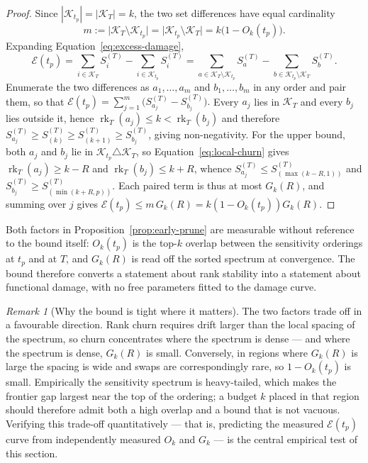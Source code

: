 \documentclass{article}
\theoremstyle{definition}
\theoremstyle{remark}
\newtheorem{remark}[theorem]{Remark}
\begin{document}
\begin{proof}
Since $|\mathcal K_{t_p}|=|\mathcal K_T|=k$, the two set differences have equal
cardinality
\[
m
:=
\bigl|\mathcal K_T\setminus\mathcal K_{t_p}\bigr|
=
\bigl|\mathcal K_{t_p}\setminus\mathcal K_T\bigr|
=
k\bigl(1-O_k(t_p)\bigr).
\]
Expanding Equation~\eqref{eq:excess-damage},
\[
\mathcal E(t_p)
=
\sum_{i\in\mathcal K_T} S^{(T)}_i
-
\sum_{i\in\mathcal K_{t_p}} S^{(T)}_i
=
\sum_{a\in\mathcal K_T\setminus\mathcal K_{t_p}} S^{(T)}_a
-
\sum_{b\in\mathcal K_{t_p}\setminus\mathcal K_T} S^{(T)}_b .
\]
Enumerate the two differences as $a_1,\ldots,a_m$ and $b_1,\ldots,b_m$ in any
order and pair them, so that
\(
\mathcal E(t_p)=\sum_{j=1}^m\bigl(S^{(T)}_{a_j}-S^{(T)}_{b_j}\bigr).
\)
Every $a_j$ lies in $\mathcal K_T$ and every $b_j$ lies outside it, hence
$\operatorname{rk}_T(a_j)\le k<\operatorname{rk}_T(b_j)$ and therefore
$S^{(T)}_{a_j}\ge S^{(T)}_{(k)}\ge S^{(T)}_{(k+1)}\ge S^{(T)}_{b_j}$, giving
non-negativity. For the upper bound, both $a_j$ and $b_j$ lie in
$\mathcal K_{t_p}\triangle\mathcal K_T$, so
Equation~\eqref{eq:local-churn} gives
$\operatorname{rk}_T(a_j)\ge k-R$ and $\operatorname{rk}_T(b_j)\le k+R$, whence
$S^{(T)}_{a_j}\le S^{(T)}_{(\max(k-R,1))}$ and
$S^{(T)}_{b_j}\ge S^{(T)}_{(\min(k+R,p))}$. Each paired term is thus at most
$G_k(R)$, and summing over $j$ gives
$\mathcal E(t_p)\le m\,G_k(R)=k(1-O_k(t_p))G_k(R)$.
\end{proof}

Both factors in Proposition~\ref{prop:early-prune} are measurable without
reference to the bound itself: $O_k(t_p)$ is the top-$k$ overlap between the
sensitivity orderings at $t_p$ and at $T$, and $G_k(R)$ is read off the sorted
spectrum at convergence. The bound therefore converts a statement about rank
stability into a statement about functional damage, with no free parameters
fitted to the damage curve.

\begin{remark}[Why the bound is tight where it matters]
The two factors trade off in a favourable direction. Rank churn requires drift
larger than the local spacing of the spectrum, so churn concentrates where the
spectrum is dense --- and where the spectrum is dense, $G_k(R)$ is small.
Conversely, in regions where $G_k(R)$ is large the spacing is wide and swaps are
correspondingly rare, so $1-O_k(t_p)$ is small. Empirically the sensitivity
spectrum is heavy-tailed, which makes the frontier gap largest near the top of
the ordering; a budget $k$ placed in that region should therefore admit both a
high overlap and a bound that is not vacuous. Verifying this trade-off
quantitatively --- that is, predicting the measured $\mathcal E(t_p)$ curve from
independently measured $O_k$ and $G_k$ --- is the central empirical test of this
section.
\end{remark}
\end{document}
